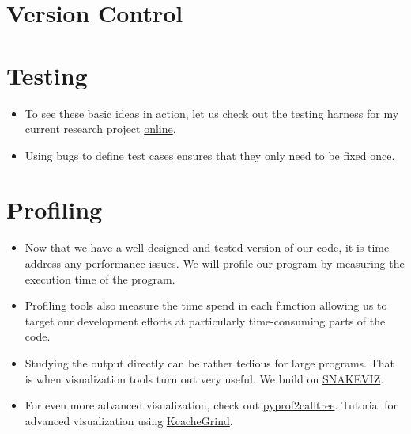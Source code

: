\section{Version Control}

\nocite{Bilschak.2016}

\section{Testing}
\begin{itemize}
\item To see these basic ideas in action, let us check out the testing harness for my current research project \href{https://github.com/robustToolbox/package/tree/master/development/tests}{online}.
\item Using bugs to define test cases ensures that they only need to be fixed once.
\end{itemize}


\section{Profiling}
\begin{itemize}
\item Now that we have a well designed and tested version of our code, it is time address any performance issues. We will profile our program by measuring the execution time of the program. 
\item Profiling tools also measure the time spend in each function allowing us to target our development efforts at particularly time-consuming parts of the code.
\item Studying the output directly can be rather tedious for large programs. That is when visualization tools turn out very useful. We build on \href{http://jiffyclub.github.io/snakeviz}{SNAKEVIZ}.
\item For even more advanced visualization, check out \href{https://github.com/pwaller/pyprof2calltree}{pyprof2calltree}. Tutorial for advanced visualization using \href{http://bit.ly/1SaXJgM}{KcacheGrind}.
\end{itemize}


